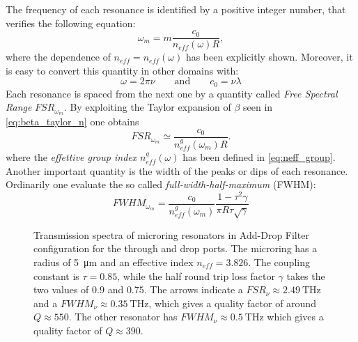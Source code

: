 The frequency of each resonance is identified by a positive integer number, that verifies the following equation:
\begin{equation}
	\omega_m = m\dfrac{c_0}{n_{eff}(\omega)R},
\end{equation}
where the dependence of $n_{eff}=n_{eff}\left(\omega\right)$ has been explicitly shown.
Moreover, it is easy to convert this quantity in other domains with:
\begin{equation}
	\omega = 2\pi\nu \qquad \mathrm{and} \qquad c_0 = \nu\lambda
	\label{eq:omega_nu_lambda}
\end{equation}
Each resonance is spaced from the next one by a quantity called \textit{Free Spectral Range} $FSR_{\omega_m}$.
By exploiting the Taylor expansion of $\beta$ seen in \cref{eq:beta_taylor_n} one obtains
\begin{equation}
	FSR_{\omega_m} \simeq \dfrac{c_0}{n_{eff}^g\left(\omega_m\right) R} .
\end{equation}
where the \textit{effettive group index} $n_{eff}^g\left(\omega\right)$ has been defined in \cref{eq:neff_group}.
Another important quantity is the width of the peaks or dips of each resonance.
Ordinarily one evaluate the so called \textit{full-width-half-maximum} (FWHM):
\begin{equation}
	FWHM_{\omega_m} = \dfrac{c_0}{n_{eff}^g\left(\omega_m\right)}\dfrac{1- \tau^2\gamma}{\pi R \tau \sqrt{\gamma}}
\end{equation}

\begin{figure}[!hbtp]
	\centering
	
	\caption{Transmission spectra of microring resonators in Add-Drop Filter configuration for the through and drop ports.
	The microring has a radius of \SI{5}{\um} and an effective index $n_{eff}=3.826$.
	The coupling constant is $\tau=0.85$, while the half round trip loss factor $\gamma$ takes the two values of $0.9$ and $0.75$.
	The arrows indicate a $FSR_\nu \approx \SI{2.49}{\THz}$ and a $FWHM_\nu \approx \SI{0.35}{\THz}$, which gives a quality factor of around $Q \approx \num{550}$.
	The other resonator has $FWHM_\nu \approx \SI{0.5}{\THz}$ which gives a quality factor of $Q \approx \num{390}$.
	}
	\label{fig:ADF2}
\end{figure}

